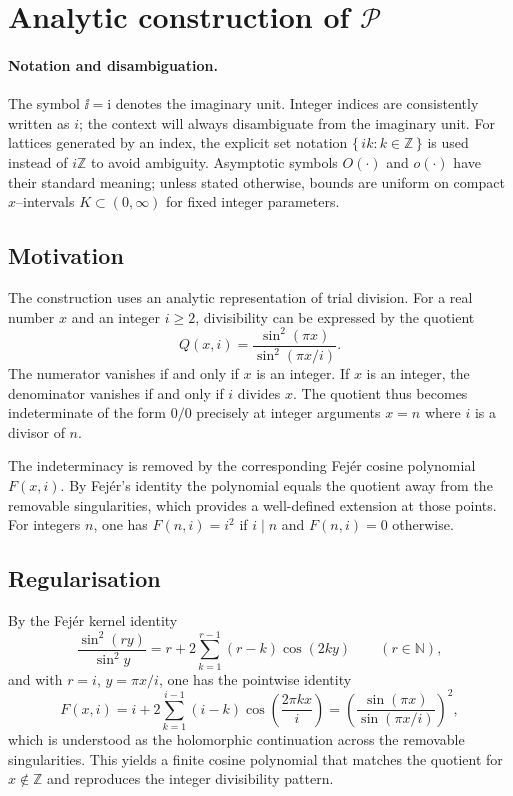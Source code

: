 \section{Analytic construction of $\mathcal{P}$}

\paragraph*{Notation and disambiguation.}
The symbol $\ii=\mathrm{i}$ denotes the imaginary unit. Integer indices are consistently written as $i$; the context will always disambiguate from the imaginary unit. For lattices generated by an index, the explicit set notation $\{\, i k : k\in\mathbb{Z}\,\}$ is used instead of $i\mathbb{Z}$ to avoid ambiguity. Asymptotic symbols $O(\cdot)$ and $o(\cdot)$ have their standard meaning; unless stated otherwise, bounds are uniform on compact $x$–intervals $K\subset(0,\infty)$ for fixed integer parameters.

\subsection{Motivation}\label{subsec:motivation}
The construction uses an analytic representation of trial division. For a real number $x$ and an integer $i \ge 2$, divisibility can be expressed by the quotient
\[
Q(x,i) = \frac{\sin^2(\pi x)}{\sin^2(\pi x/i)}.
\]
The numerator vanishes if and only if $x$ is an integer. If $x$ is an integer, the denominator vanishes if and only if $i$ divides $x$. The quotient thus becomes indeterminate of the form $0/0$ precisely at integer arguments $x=n$ where $i$ is a divisor of $n$.

The indeterminacy is removed by the corresponding Fejér cosine polynomial $F(x,i)$. By Fejér’s identity the polynomial equals the quotient away from the removable singularities, which provides a well-defined extension at those points. For integers $n$, one has $F(n,i)=i^2$ if $i\mid n$ and $F(n,i)=0$ otherwise.

\subsection{Regularisation}
By the Fejér kernel identity~\cite{zygmund2002}
\[
\frac{\sin^{2}(r y)}{\sin^{2}y}=r+2\sum_{k=1}^{r-1}(r-k)\cos(2k y)\qquad (r\in\mathbb N),
\]
and with \(r=i\), \(y=\pi x/i\), one has the pointwise identity
\[
F(x,i)=i+2\sum_{k=1}^{i-1}(i-k)\cos\!\left(\frac{2\pi k x}{i}\right)
=\left(\frac{\sin(\pi x)}{\sin(\pi x/i)}\right)^{\!2},
\]
which is understood as the holomorphic continuation across the removable singularities. This yields a finite cosine polynomial that matches the quotient for \(x\notin\mathbb{Z}\) and reproduces the integer divisibility pattern.

